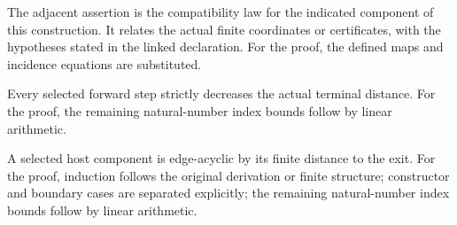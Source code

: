 The adjacent assertion is the compatibility law for the indicated component of this construction. It relates the actual finite coordinates or certificates, with the hypotheses stated in the linked declaration.
For the proof, the defined maps and incidence equations are substituted.
\par{}

Every selected forward step strictly decreases the actual terminal distance.
For the proof, the remaining natural-number index bounds follow by linear arithmetic.
\par{}

A selected host component is edge-acyclic by its finite distance to the exit.
For the proof, induction follows the original derivation or finite structure; constructor and boundary cases are separated explicitly; the remaining natural-number index bounds follow by linear arithmetic.
\par{}

